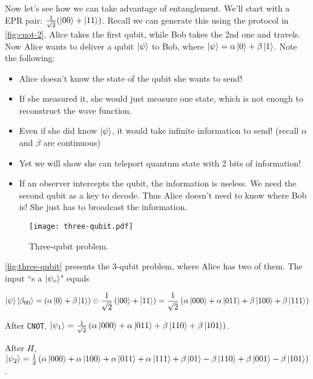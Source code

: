 \documentclass[12pt, english]{book}
\begin{document}
Now let's see how we can take advantage of entanglement. 
We'll start with a EPR pair: $\frac{1}{\sqrt{2}} (\ket{00} + \ket{11})$.
Recall we can generate this using the protocol in \autoref{fig:cnot-2}.
Alice takes the first qubit, while Bob takes the 2nd one and travels.
Now Alice wants to deliver a qubit $\ket{\psi}$ to Bob, where $\ket{\psi} = \alpha \ket{0} + \beta \ket{1}$.
Note the following:

\begin{itemize}
	\item Alice doesn't know the state of the qubit she wants to send!
	
	\item If she measured it, she would just measure one state, which is not enough to reconstruct the wave function.
	
	\item Even if she did know $\ket{\psi}$, it would take infinite information to send! 
	(recall $\alpha$ and $\beta$ are continuous)
	
	\item Yet we will show she can teleport quantum state with 2 bits of information!
	
	\item If an observer intercepts the qubit, the information is useless.
	We need the second qubit as a key to decode.
	Thus Alice doesn't need to know where Bob is! 
	She just has to broadcast the information.
\end{itemize}

\begin{figure}[!ht]
	\centering
	\texttt{[image: three-qubit.pdf]}
	\caption{Three-qubit problem.}
	\label{fig:three-qubit}
\end{figure}

\autoref{fig:three-qubit} presents the 3-qubit problem, where Alice has two of them.
The input ``s a $\ket{\psi_o}$" equals

\[ \ket{\psi} \ket{\beta_{00}} = \left( \alpha \ket{0} + \beta \ket{1} \right) \otimes \frac{1}{\sqrt{2}} \left( \ket{00} + \ket{11} \right) = \frac{1}{\sqrt{2}} \left( \alpha \ket{000} + \alpha \ket{011} + \beta \ket{100} + \beta \ket{111} \right) \]

After \texttt{CNOT}, $\ket{\psi_1} = \frac{1}{\sqrt{2}} \left( \alpha \ket{000} + \alpha \ket{011} + \beta \ket{110} + \beta \ket{101} \right)$.

After $H$, $\ket{\psi_2} = \frac{1}{2} \left( \alpha \ket{000} + \alpha \ket{100} + \alpha \ket{011} + \alpha \ket{111} + \beta \ket{01} - \beta \ket{110} + \beta \ket{001} - \beta \ket{101} \right)$.
\end{document}
